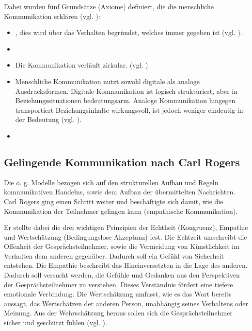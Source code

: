 Dabei wurden fünf Grundsätze (Axiome) definiert, die die menschliche Kommunikation erklären (vgl. \cite{Watzlawick2016-km}):
\begin{itemize}
    \item {}, dies wird über das Verhalten begründet, welches immer gegeben ist (vgl. \cite[S. 53]{Watzlawick2016-km}).
    \item {} \cite[S. 64]{Watzlawick2016-km}
    \item {} Die Kommunikation verläuft zirkular. (vgl. \cite[S. 69]{Watzlawick2016-km})
    \item Menschliche Kommunikation nutzt sowohl digitale als analoge Ausdrucksformen. Digitale Kommunikation ist logisch strukturiert, aber in Beziehungssituationen bedeutungsarm. Analoge Kommunikation hingegen transportiert Beziehungsinhalte wirkungsvoll, ist jedoch weniger eindeutig in der Bedeutung (vgl. \cite[S. 77]{Watzlawick2016-km}).
    \item {} \cite[S. 80]{Watzlawick2016-km}
\end{itemize}

\subsection{Gelingende Kommunikation nach Carl Rogers}
Die o. g. Modelle bezogen sich auf den strukturellen Aufbau und Regeln kommunikativen Handelns, sowie dem Aufbau der übermittelten Nachrichten. Carl Rogers ging einen Schritt weiter und beschäftigte sich damit, wie die Kommunikation der Teilnehmer gelingen kann (empathische Kommunikation). 

Er stellte dabei die drei wichtigen Prinzipien der Echtheit (Kongruenz), Empathie und Wertschätzung (Bedingungslose Akzeptanz) fest. Die Echtzeit umschreibt die Offenheit der Gesprächsteilnehmer, sowie die Vermeidung von Künstlichkeit im Verhalten dem anderen gegenüber. Dadurch soll ein Gefühl von Sicherheit entstehen. Die Empathie beschreibt das Hineinversetzten in die Lage des anderen. Dadurch soll versucht werden, die Gefühle und Gedanken aus den Perspektiven der Gesprächsteilnehmer zu verstehen. Dieses Verständnis fördert eine tiefere emotionale Verbindung. Die Wertschätzung umfasst, wie es das Wort bereits aussagt, das Wertschätzen der anderen Person, unabhängig seines Verhaltens oder Meinung. Aus der Wehrschätzung heraus sollen sich die Gesprächsteilnehmer sicher und geschützt fühlen (vgl. \cite{jesse_carl_2025}).

